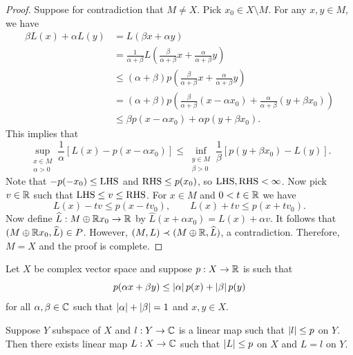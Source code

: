 \documentclass[a4paper]{article}
\begin{document}
\begin{proof}
Suppose for contradiction that $M \neq X$. Pick $x_0 \in X
\setminus M$. For any $x, y \in M$, we have
\[
\begin{aligned}
\beta L(x) + \alpha L(y)
&= L(\beta x + \alpha y) \\
&= \frac{1}{\alpha + \beta} L \left(
  \frac{\beta}{\alpha + \beta} x + \frac{\alpha}{\alpha + \beta} y
 \right)\\
& \leq (\alpha + \beta) p \left(
  \frac{\beta}{\alpha + \beta} x + \frac{\alpha}{\alpha + \beta} y
 \right)\\
&= (\alpha + \beta) p \left(
  \frac{\beta}{\alpha + \beta} (x - \alpha x_0)
  + \frac{\alpha}{\alpha + \beta} (y + \beta x_0)
 \right)\\
& \leq \beta p(x - \alpha x_0) + \alpha p(y + \beta x_0).
\end{aligned}
\]
This implies that
\[
\sup_{\substack{x \in M \\ \alpha > 0}}
\frac{1}{\alpha} \left[ L(x) - p(x - \alpha x_0) \right]
\leq \inf_{\substack{y \in M \\ \beta > 0}}
\frac{1}{\beta} \left[ p(y + \beta x_0) - L(y) \right].
\]
Note that $-p(-x_0) \leq \operatorname{LHS}$ and $\operatorname{RHS} \leq p(x_0)$, so
$\operatorname{LHS}, \operatorname{RHS} < \infty$. Now pick $v \in \mathbb{R}$ such that
$\operatorname{LHS} \leq v \leq \operatorname{RHS}$. For $x \in M$ and $0 < t \in \mathbb{R}$ we have
\[
L(x) - tv \leq p(x - t v_0), \qquad
L(x) + tv \leq p(x + t v_0).
\]
Now define $\widehat{L}: M \oplus \mathbb{R} x_0 \to \mathbb{R}$ by
$\hat{L}(x + \alpha x_0) = L(x) + \alpha v$. It follows that
$(M \oplus \mathbb{R} x_0 , \widehat{L}) \in P$. However, $(M, L) \prec
(M \oplus \mathbb{R}, \widehat{L})$, a contradiction. Therefore, $M = X$
and the proof is complete.

\end{proof}

\begin{thm}
Let $X$ be complex vector space and suppose $p: X \to \mathbb{R}$
is such that
\[
p(\alpha x + \beta y) \leq \left\lvert \alpha\right\rvert p(x) + \left\lvert \beta\right\rvert p(y)
\]
for all $\alpha, \beta \in \mathbb{C}$ such that $\left\lvert \alpha\right\rvert +
\left\lvert \beta\right\rvert=1$ and $x, y \in X$.

Suppose $Y$ subspace of $X$ and $l: Y \to \mathbb{C}$ is a linear map
such that $\left\lvert l\right\rvert \leq p$ on $Y$. Then there exists linear map
$L: X \to \mathbb{C}$ such that $\left\lvert L\right\rvert \leq p$ on $X$ and
$L = l$ on $Y$.
\end{thm}
\end{document}
